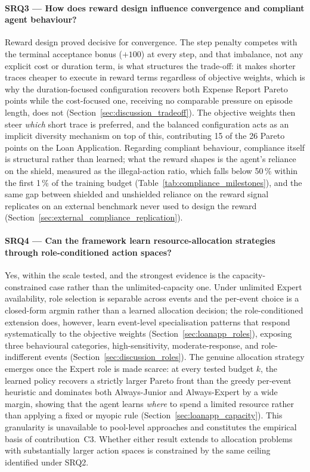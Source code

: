 \paragraph{SRQ3 --- How does reward design influence convergence and compliant agent behaviour?} Reward design proved decisive for convergence. The step penalty competes with the terminal acceptance bonus ($+100$) at every step, and that imbalance, not any explicit cost or duration term, is what structures the trade-off: it makes shorter traces cheaper to execute in reward terms regardless of objective weights, which is why the duration-focused configuration recovers both Expense Report Pareto points while the cost-focused one, receiving no comparable pressure on episode length, does not (Section~\ref{sec:discussion_tradeoff}). The objective weights then steer \emph{which} short trace is preferred, and the balanced configuration acts as an implicit diversity mechanism on top of this, contributing 15 of the 26 Pareto points on the Loan Application. Regarding compliant behaviour, compliance itself is structural rather than learned; what the reward shapes is the agent's reliance on the shield, measured as the illegal-action ratio, which falls below 50\,\% within the first 1\,\% of the training budget (Table~\ref{tab:compliance_milestones}), and the same gap between shielded and unshielded reliance on the reward signal replicates on an external benchmark never used to design the reward (Section~\ref{sec:external_compliance_replication}).

\paragraph{SRQ4 --- Can the framework learn resource-allocation strategies through role-conditioned action spaces?} Yes, within the scale tested, and the strongest evidence is the capacity-constrained case rather than the unlimited-capacity one. Under unlimited Expert availability, role selection is separable across events and the per-event choice is a closed-form argmin rather than a learned allocation decision; the role-conditioned extension does, however, learn event-level specialisation patterns that respond systematically to the objective weights (Section~\ref{sec:loanapp_roles}), exposing three behavioural categories, high-sensitivity, moderate-response, and role-indifferent events (Section~\ref{sec:discussion_roles}). The genuine allocation strategy emerges once the Expert role is made scarce: at every tested budget $k$, the learned policy recovers a strictly larger Pareto front than the greedy per-event heuristic and dominates both Always-Junior and Always-Expert by a wide margin, showing that the agent learns \emph{where} to spend a limited resource rather than applying a fixed or myopic rule (Section~\ref{sec:loanapp_capacity}). This granularity is unavailable to pool-level approaches and constitutes the empirical basis of contribution~C3. Whether either result extends to allocation problems with substantially larger action spaces is constrained by the same ceiling identified under SRQ2.

